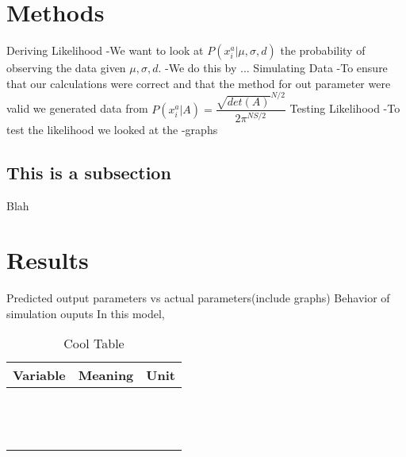 \documentclass{article}
\newcommand{\D}{\displaystyle}
\begin{document}
\section{Methods}
Deriving Likelihood\hfill\break
-We want to look at $P(x_i^a|\mu,\sigma, d)$ the probability of observing the data given $\mu,\sigma,d$.
-We do this by ... \hfill\break
Simulating Data\hfill\break
-To ensure that our calculations were correct and that the method for out parameter were valid we generated data from $P(x_i^a| A)=\dfrac{\sqrt{det(A)}^{N/2}}{2\pi^{NS/2}}$ \hfill\break
Testing Likelihood\hfill\break
-To test the likelihood we looked at the 
-graphs\hfill\break
\hfill\break
\subsection{This is a subsection}
Blah
\hfill\break

\hfill\break

\section{Results}
Predicted output parameters vs actual parameters(include graphs)\hfill\break
Behavior of simulation ouputs\hfill\break
\hfill\break
\hfill\break
In this model,
\hfill\break
\begin{table}
\caption{Cool Table} 
\centering 
\begin{tabular}{lll}
\hline
Variable  & Meaning &Unit\\ [0.5ex]
\hline
\\
&  &  $\D\frac{\mbox{}}{}$ \\ [0.5ex]	
&  &  $\D\frac{\mbox{}}{}$ \\ [0.5ex]
& &$\D\frac{\mbox{}}{}$ \\[0.5ex]
& &  $\D\frac{\mbox{}}{}$  \\ [0.5ex]

\hline
\end{tabular}
\label{table:variables} 
\end{table}
\hfill\break
\end{document}
